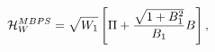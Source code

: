 \begin{equation}
\label{bpsene3}
{\cal H}_{W}^{MBPS} = \sqrt{W_1}
\left[ \Pi + \frac{\sqrt{1 + B_1^2}}{B_1} B \right],
\end{equation}

